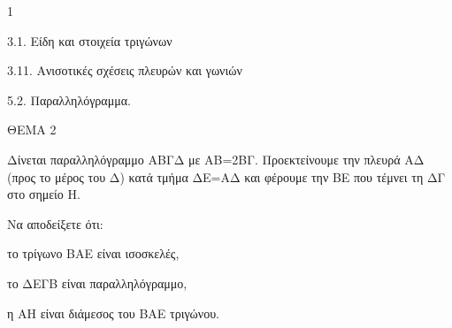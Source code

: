 \begin{ylh}{1}
    \item 3.1. Είδη και στοιχεία τριγώνων
    \item 3.11. Ανισοτικές σχέσεις πλευρών και γωνιών
    \item 5.2. Παραλληλόγραμμα.
\end{ylh}

ΘΕΜΑ 2

Δίνεται παραλληλόγραμμο ΑΒΓΔ με ΑΒ=2ΒΓ. Προεκτείνουμε την πλευρά ΑΔ (προς το μέρος του Δ) κατά τμήμα ΔΕ=ΑΔ και φέρουμε την ΒΕ που τέμνει τη ΔΓ στο σημείο Η.

Να αποδείξετε ότι:

\begin{alist}
\item το τρίγωνο ΒΑΕ είναι ισοσκελές, 

\item το ΔΕΓΒ είναι παραλληλόγραμμο, 

\item η ΑΗ είναι διάμεσος του ΒΑΕ τριγώνου. 
\end{alist}
